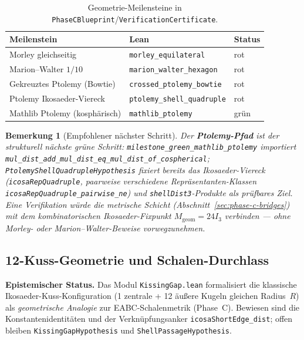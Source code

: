 \documentclass[11pt,a4paper]{article}
\newtheorem{remark}{Bemerkung}
\begin{document}
	\begin{table}[h!]
		\centering
		\small
		\begin{tabular}{@{}lll@{}}
			\hline
			\textbf{Meilenstein} & \textbf{Lean} & \textbf{Status} \\
			\hline
			Morley gleichseitig & \texttt{morley\_equilateral} & rot \\
			Marion--Walter $1/10$ & \texttt{marion\_walter\_hexagon} & rot \\
			Gekreuztes Ptolemy (Bowtie) & \texttt{crossed\_ptolemy\_bowtie} & rot \\
			Ptolemy Ikosaeder-Viereck & \texttt{ptolemy\_shell\_quadruple} & rot \\
			Mathlib Ptolemy (kosphärisch) & \texttt{mathlib\_ptolemy} & grün \\
			\hline
		\end{tabular}
		\caption{Geometrie-Meilensteine in \texttt{PhaseCBlueprint}/\texttt{VerificationCertificate}.}
		\label{tab:geometry-milestones}
	\end{table}
	
	\begin{remark}[Empfohlener nächster Schritt]
		Der \textbf{Ptolemy-Pfad} ist der strukturell nächste grüne Schritt:
		\texttt{milestone\_green\_mathlib\_ptolemy} importiert
		\texttt{mul\_dist\_add\_mul\_dist\_eq\_mul\_dist\_of\_cospherical};
		\texttt{PtolemyShellQuadrupleHypothesis} fixiert bereits das Ikosaeder-Viereck
		(\texttt{icosaRepQuadruple}, paarweise verschiedene Repräsentanten-Klassen
		\texttt{icosaRepQuadruple\_pairwise\_ne}) und \texttt{shellDist3}-Produkte als prüfbares Ziel.
		Eine Verifikation würde die metrische Schicht (Abschnitt~\ref{sec:phase-c-bridges})
		mit dem kombinatorischen Ikosaeder-Fixpunkt $M_{\mathrm{geom}}=24I_3$ verbinden ---
		ohne Morley- oder Marion--Walter-Beweise vorwegzunehmen.
	\end{remark}
	
	\subsection{12-Kuss-Geometrie und Schalen-Durchlass}
	\label{sec:kissing-gap}
	
	\textbf{Epistemischer Status.}
	Das Modul \texttt{KissingGap.lean} formalisiert die klassische Ikosaeder-Kuss-Konfiguration
	(1 zentrale + 12 äußere Kugeln gleichen Radius~$R$) als \emph{geometrische Analogie}
	zur EABC-Schalenmetrik (Phase~C). Bewiesen sind die Konstantenidentitäten und der
	Verknüpfungsanker \texttt{icosaShortEdge\_dist}; offen bleiben
	\texttt{KissingGapHypothesis} und \texttt{ShellPassageHypothesis}.
	
\end{document}
